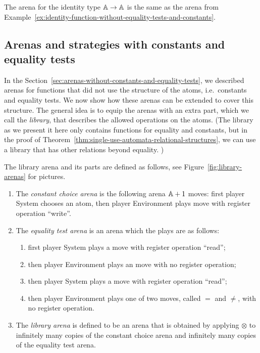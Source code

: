 

\begin{example}
    The arena for the identity type $\mathbb A \to \mathbb A$ is the same as the arena from Example~\ref{ex:identity-function-without-equality-tests-and-constants}.
\end{example}





\subsection{Arenas and strategies with constants and equality tests}
\label{sec:arenas-with-constants-and-equality-tests}
In the Section~\ref{sec:arenas-without-constants-and-equality-tests}, we described arenas for functions that did not use the structure of the atoms, i.e.~constants and equality tests. We now show how these arenas can be extended to cover this structure. The general idea is to equip the arenas with an extra part, which we call the \emph{library},  that describes the allowed operations on the atoms. (The library as we present it here only contains functions for equality and constants, but in the proof of Theorem~\ref{thm:single-use-automata-relational-structures}, we can use a library that has other relations beyond equality. )



\begin{definition} \label{def:library-arena} The library arena and its parts are defined as follows, see Figure~\ref{fig:library-arenas} for pictures.
    \begin{enumerate}
        \item The \emph{constant choice arena} is the following arena $\mathbb A+1$ moves:
        first player System chooses an atom, then player Environment plays move with register operation ``write''. 
        \item The \emph{equality test arena} is an arena which the plays are as follows:
    \begin{enumerate}
        \item first player System plays a move with register operation ``read'';
        \item then player Environment plays an move with no register operation;
        \item then player System plays a move with register operation ``read'';
        \item then player Environment plays one of two moves, called $=$ and $\neq$, with no register operation.
    \end{enumerate}
    \item The \emph{library arena} is defined to be an arena that is obtained by applying $\otimes$ to infinitely many copies of the constant choice arena and infinitely many copies of the  equality test arena.
    \end{enumerate}
\end{definition}

